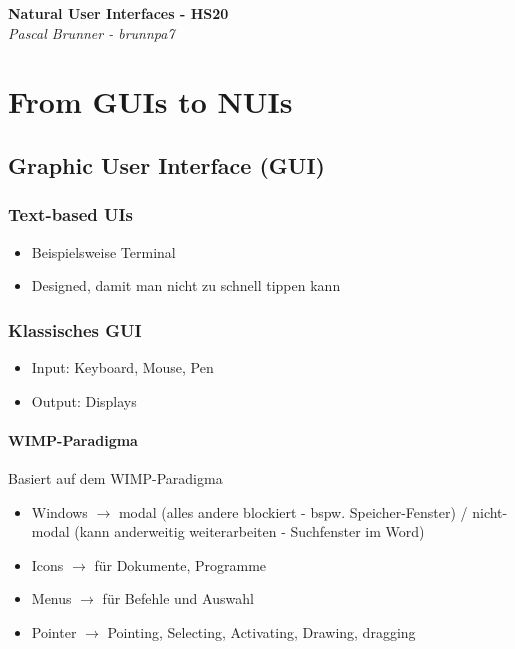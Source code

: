 \documentclass{report}
\newenvironment{Figure}
	{\par\medskip\noindent\minipage{\linewidth}}
	{\endminipage\par\medskip}
\theoremstyle{definition}
\theoremstyle{example}
\begin{document}
\begin{titlepage}
   \begin{center}
      \Large\textbf{Natural User Interfaces - HS20}\\
      \large\textit{Pascal Brunner - brunnpa7}
   \end{center}
\end{titlepage}


\tableofcontents

\newpage

\chapter{From GUIs to NUIs}

\section*{Graphic User Interface (GUI)}
\subsection{Text-based UIs}
\begin{itemize}
   \item Beispielsweise Terminal
   \item Designed, damit man nicht zu schnell tippen kann
\end{itemize}

\subsection{Klassisches GUI}
\begin{itemize}
   \item Input: Keyboard, Mouse, Pen
   \item Output: Displays
\end{itemize}

\subsubsection{WIMP-Paradigma}
Basiert auf dem WIMP-Paradigma
\begin{itemize}
   \item Windows $\rightarrow$ modal (alles andere blockiert - bspw. Speicher-Fenster) / nicht-modal (kann anderweitig weiterarbeiten - Suchfenster im Word)
   \item Icons $\rightarrow$ für Dokumente, Programme
   \item Menus $\rightarrow$ für Befehle und Auswahl
   \item Pointer $\rightarrow$ Pointing, Selecting, Activating, Drawing, dragging
\end{itemize}
\end{document}
